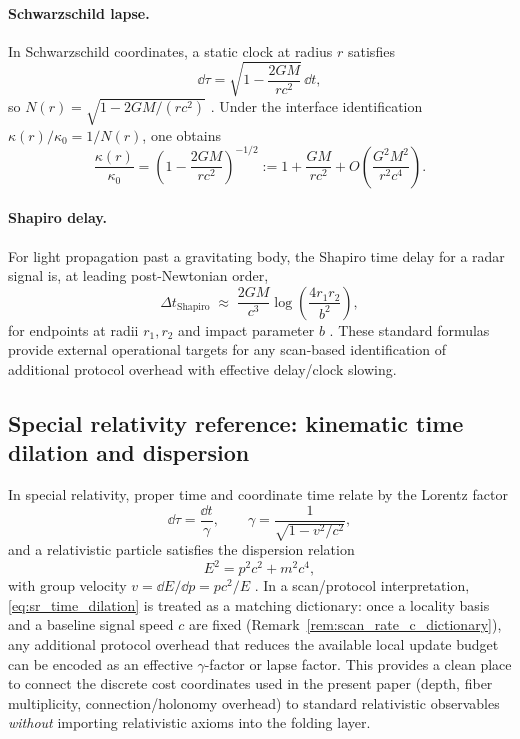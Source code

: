 \paragraph{Schwarzschild lapse.}
In Schwarzschild coordinates, a static clock at radius $r$ satisfies
\begin{equation}
\label{eq:schwarzschild_lapse}
\dd\tau=\sqrt{1-\frac{2GM}{rc^2}}\,\dd t,
\end{equation}
so $N(r)=\sqrt{1-2GM/(rc^2)}$ \cite{Wald1984}.
Under the interface identification $\kappa(r)/\kappa_0=1/N(r)$, one obtains
\begin{equation}
\label{eq:kappa_schwarzschild_series}
\frac{\kappa(r)}{\kappa_0}=\left(1-\frac{2GM}{rc^2}\right)^{-1/2}
:=1+\frac{GM}{rc^2}+O\!\left(\frac{G^2M^2}{r^2c^4}\right).
\end{equation}

\paragraph{Shapiro delay.}
For light propagation past a gravitating body, the Shapiro time delay for a radar signal is, at leading post-Newtonian order,
\begin{equation}
\label{eq:shapiro_delay}
\Delta t_{\mathrm{Shapiro}}\;\approx\;\frac{2GM}{c^3}\log\!\left(\frac{4r_1 r_2}{b^2}\right),
\end{equation}
for endpoints at radii $r_1,r_2$ and impact parameter $b$ \cite{Shapiro1964,Will1993}.
These standard formulas provide external operational targets for any scan-based identification of additional protocol overhead with effective delay/clock slowing.

\subsection{Special relativity reference: kinematic time dilation and dispersion}
\label{app:sr_time_dilation_dispersion}

In special relativity, proper time and coordinate time relate by the Lorentz factor
\begin{equation}
\label{eq:sr_time_dilation}
\dd\tau=\frac{\dd t}{\gamma},\qquad
\gamma=\frac{1}{\sqrt{1-v^2/c^2}},
\end{equation}
and a relativistic particle satisfies the dispersion relation
\begin{equation}
\label{eq:sr_dispersion}
E^2=p^2c^2+m^2c^4,
\end{equation}
with group velocity $v=\dd E/\dd p=pc^2/E$ \cite{Einstein1905,Rindler2006}.
In a scan/protocol interpretation, \eqref{eq:sr_time_dilation} is treated as a matching dictionary:
once a locality basis and a baseline signal speed $c$ are fixed (Remark~\ref{rem:scan_rate_c_dictionary}), any additional protocol overhead that reduces the available local update budget can be encoded as an effective $\gamma$-factor or lapse factor.
This provides a clean place to connect the discrete cost coordinates used in the present paper (depth, fiber multiplicity, connection/holonomy overhead) to standard relativistic observables \emph{without} importing relativistic axioms into the folding layer.

